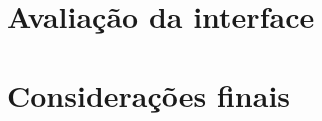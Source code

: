 \documentclass[12pt,a4paper]{article}
\begin{document}
\FloatBarrier
\section{Avaliação da interface}

\FloatBarrier
\section{Considerações finais}

\FloatBarrier

\end{document}
